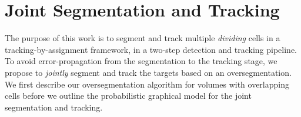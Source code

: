 \documentclass[10pt,twocolumn,letterpaper]{article}
\begin{document}

% 
% 



\section{Joint Segmentation and Tracking}
\label{sec:method}

The purpose of this work is to segment and track multiple \emph{dividing} cells in a 
tracking-by-assignment framework, \ie in a two-step detection and tracking pipeline. 
To avoid error-propagation from the segmentation to the tracking stage, we propose to
\emph{jointly} segment and track the targets based on an oversegmentation. 
We first describe %
our oversegmentation algorithm for
volumes with overlapping cells before we outline the probabilistic graphical model for 
the joint segmentation and tracking. 
\end{document}
